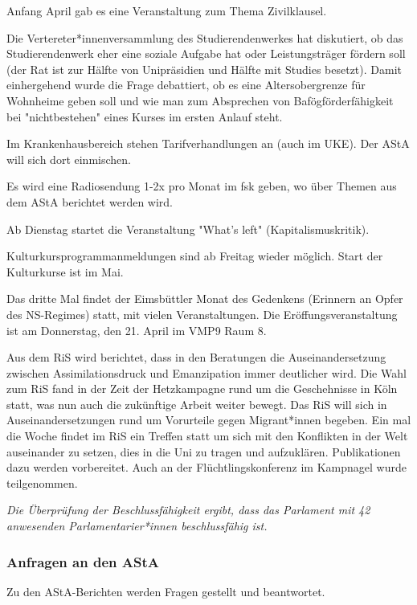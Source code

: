 \documentclass[ngerman,headheight=70pt]{scrartcl}
\begin{document}
    Anfang April gab es eine Veranstaltung zum Thema Zivilklausel.

    Die Vertereter*innenversammlung des Studierendenwerkes hat diskutiert,
    ob das Studierendenwerk eher eine soziale Aufgabe hat oder Leistungsträger
    fördern soll (der Rat ist zur Hälfte von Unipräsidien und Hälfte
    mit Studies besetzt). Damit einhergehend wurde die Frage debattiert, ob es
    eine Altersobergrenze für Wohnheime geben soll und wie man zum Absprechen
    von Bafögförderfähigkeit bei "nichtbestehen" eines Kurses im ersten Anlauf steht.

    Im Krankenhausbereich stehen Tarifverhandlungen an (auch im UKE). Der AStA
    will sich dort einmischen.

    Es wird eine Radiosendung 1-2x pro Monat im fsk geben, wo über Themen aus
    dem AStA berichtet werden wird.

    Ab Dienstag startet die Veranstaltung "What's left" (Kapitalismuskritik).

    Kulturkursprogrammanmeldungen sind ab Freitag wieder möglich. Start der
    Kulturkurse ist im Mai.

    Das dritte Mal findet der Eimsbüttler Monat des Gedenkens (Erinnern an Opfer
    des NS-Regimes) statt, mit vielen Veranstaltungen. Die Eröffungsveranstaltung
    ist am Donnerstag, den 21. April im VMP9 Raum 8.

    Aus dem RiS wird berichtet, dass in den Beratungen die Auseinandersetzung
    zwischen Assimilationsdruck und Emanzipation immer deutlicher wird. Die Wahl
    zum RiS fand in der Zeit der Hetzkampagne rund um die Geschehnisse in Köln
    statt, was nun auch die zukünftige Arbeit weiter bewegt. Das RiS will sich
    in Auseinandersetzungen rund um Vorurteile gegen Migrant*innen begeben.
    Ein mal die Woche findet im RiS ein Treffen statt um sich mit den
    Konflikten in der Welt auseinander zu setzen, dies in die Uni zu tragen
    und aufzuklären. Publikationen dazu werden vorbereitet. Auch an der
    Flüchtlingskonferenz im Kampnagel wurde teilgenommen.

    \textit{Die Überprüfung der Beschlussfähigkeit ergibt, dass das Parlament
    mit 42 anwesenden Parlamentarier*innen beschlussfähig ist.}

    \subsubsection{Anfragen an den AStA}

    Zu den AStA-Berichten werden Fragen gestellt und beantwortet.
\end{document}
